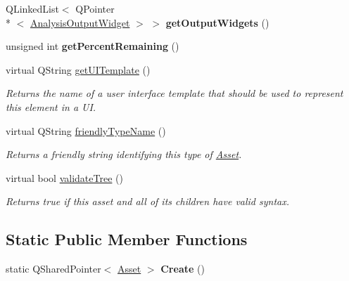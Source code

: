 \begin{DoxyCompactItemize}
\item 
\hypertarget{class_picto_1_1_analysis_container_af3b61093b3c19c349a1a2a6c0f5ad2ed}{Q\-Linked\-List$<$ Q\-Pointer\\*
$<$ \hyperlink{class_picto_1_1_analysis_output_widget}{Analysis\-Output\-Widget} $>$ $>$ {\bfseries get\-Output\-Widgets} ()}\label{class_picto_1_1_analysis_container_af3b61093b3c19c349a1a2a6c0f5ad2ed}

\item 
\hypertarget{class_picto_1_1_analysis_container_a51bde109cd603d6bfd67c471527459a8}{unsigned int {\bfseries get\-Percent\-Remaining} ()}\label{class_picto_1_1_analysis_container_a51bde109cd603d6bfd67c471527459a8}

\item 
\hypertarget{class_picto_1_1_analysis_container_a5a5663f4c5080e23f09bd2b7544feaf8}{virtual Q\-String \hyperlink{class_picto_1_1_analysis_container_a5a5663f4c5080e23f09bd2b7544feaf8}{get\-U\-I\-Template} ()}\label{class_picto_1_1_analysis_container_a5a5663f4c5080e23f09bd2b7544feaf8}

\begin{DoxyCompactList}\small\item\em Returns the name of a user interface template that should be used to represent this element in a U\-I. \end{DoxyCompactList}\item 
virtual Q\-String \hyperlink{class_picto_1_1_analysis_container_a0e12a7b8c9e87c5c89bed790fa334fc2}{friendly\-Type\-Name} ()
\begin{DoxyCompactList}\small\item\em Returns a friendly string identifying this type of \hyperlink{class_picto_1_1_asset}{Asset}. \end{DoxyCompactList}\item 
virtual bool \hyperlink{class_picto_1_1_analysis_container_af6f0f3307b57e468ee6331c2470c70a3}{validate\-Tree} ()
\begin{DoxyCompactList}\small\item\em Returns true if this asset and all of its children have valid syntax. \end{DoxyCompactList}\end{DoxyCompactItemize}
\subsection*{Static Public Member Functions}
\begin{DoxyCompactItemize}
\item 
\hypertarget{class_picto_1_1_analysis_container_ab7aa4dc6f3ef219d55da8adfdafb3160}{static Q\-Shared\-Pointer$<$ \hyperlink{class_picto_1_1_asset}{Asset} $>$ {\bfseries Create} ()}\label{class_picto_1_1_analysis_container_ab7aa4dc6f3ef219d55da8adfdafb3160}

\end{DoxyCompactItemize}
